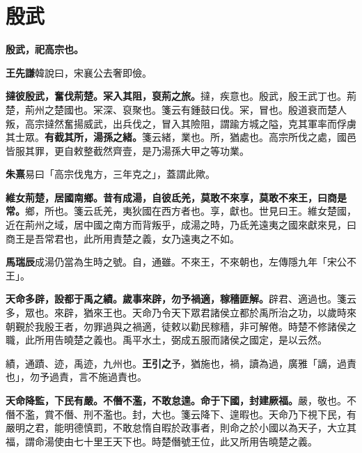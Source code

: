 \section{殷武}


\textbf{殷武，祀高宗也。}

\begin{quoting}\textbf{王先謙}韓說曰，宋襄公去奢即儉。\end{quoting}

\textbf{撻彼殷武，奮伐荊楚。冞入其阻，裒荊之旅。}{\footnotesize 撻，疾意也。殷武，殷王武丁也。荊楚，荊州之楚國也。冞深、裒聚也。箋云有鍾鼓曰伐。冞，冒也。殷道衰而楚人叛，高宗撻然奮揚威武，出兵伐之，冒入其險阻，謂踰方城之隘，克其軍率而俘虜其士眾。}\textbf{有截其所，湯孫之緒。}{\footnotesize 箋云緒，業也。所，猶處也。高宗所伐之處，國邑皆服其罪，更自敕整截然齊壹，是乃湯孫大甲之等功業。}

\begin{quoting}\textbf{朱熹}易曰「高宗伐鬼方，三年克之」，蓋謂此歟。\end{quoting}

\textbf{維女荊楚，居國南鄉。昔有成湯，自彼氐羌，莫敢不來享，莫敢不來王，曰商是常。}{\footnotesize 鄉，所也。箋云氐羌，夷狄國在西方者也。享，獻也。世見曰王。維女楚國，近在荊州之域，居中國之南方而背叛乎，成湯之時，乃氐羌遠夷之國來獻來見，曰商王是吾常君也，此所用責楚之義，女乃遠夷之不如。}

\begin{quoting}\textbf{馬瑞辰}成湯仍當為生時之號。自，通雖。不來王，不來朝也，左傳隱九年「宋公不王」。\end{quoting}

\textbf{天命多辟，設都于禹之績。歲事來辟，勿予禍適，稼穡匪解。}{\footnotesize 辟君、適過也。箋云多，眾也。來辟，猶來王也。天命乃令天下眾君諸侯立都於禹所治之功，以歲時來朝覲於我殷王者，勿罪過與之禍適，徒敕以勸民稼穡，非可解倦。時楚不修諸侯之職，此所用告曉楚之義也。禹平水土，弼成五服而諸侯之國定，是以云然。}

\begin{quoting}績，通蹟、迹，禹迹，九州也。\textbf{王引之}予，猶施也，禍，讀為過，廣雅「謫，過責也」，勿予過責，言不施過責也。\end{quoting}

\textbf{天命降監，下民有嚴。不僭不濫，不敢怠遑。命于下國，封建厥福。}{\footnotesize 嚴，敬也。不僭不濫，賞不僭、刑不濫也。封，大也。箋云降下、遑暇也。天命乃下視下民，有嚴明之君，能明德慎罰，不敢怠惰自暇於政事者，則命之於小國以為天子，大立其福，謂命湯使由七十里王天下也。時楚僭號王位，此又所用告曉楚之義。}

